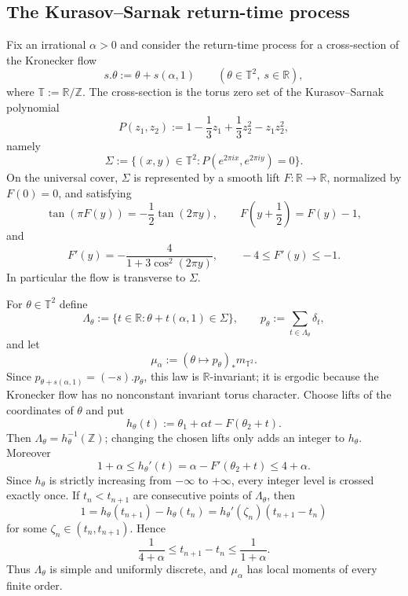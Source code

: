 \documentclass[11pt,reqno,a4paper]{amsart}
\numberwithin{equation}{section}
\theoremstyle{compact}
\theoremstyle{definition}
\theoremstyle{definition}
\begin{document}
\subsection{The Kurasov--Sarnak return-time process}
\label{subsec:kurasov-sarnak}

Fix an irrational $\alpha>0$ and consider the return-time process for a
cross-section of the Kronecker flow
\begin{equation}\label{eq:ks-kronecker-flow}
  s.\theta:=\theta+s(\alpha,1)
  \qquad(\theta\in\mathbb T^2,\ s\in\mathbb R),
\end{equation}
where $\mathbb T:=\mathbb R/\mathbb Z$.  The cross-section is the torus zero
set of the Kurasov--Sarnak polynomial
\begin{equation}\label{eq:ks-polynomial}
  P(z_1,z_2)
  :=1-\frac13z_1+\frac13z_2^2-z_1z_2^2,
\end{equation}
namely
\begin{equation}\label{eq:ks-zero-curve}
  \Sigma
  :=\bigl\{(x,y)\in\mathbb T^2:
      P(e^{2\pi i x},e^{2\pi i y})=0\bigr\}.
\end{equation}
On the universal cover, $\Sigma$ is represented by a smooth lift
$F:\mathbb R\to\mathbb R$, normalized by $F(0)=0$, and satisfying
\begin{equation}\label{eq:ks-curve-lift}
  \tan(\pi F(y))=-\frac12\tan(2\pi y),
  \qquad
  F\!\left(y+\frac12\right)=F(y)-1,
\end{equation}
and
\begin{equation}\label{eq:ks-curve-derivative}
  F'(y)=-\frac{4}{1+3\cos^2(2\pi y)},
  \qquad -4\leq F'(y)\leq-1.
\end{equation}
In particular the flow is transverse to $\Sigma$.

For $\theta\in\mathbb T^2$ define
\begin{equation}\label{eq:ks-point-process-factor}
  \Lambda_\theta
  :=\bigl\{t\in\mathbb R:
      \theta+t(\alpha,1)\in\Sigma\bigr\},
  \qquad
  p_\theta:=\sum_{t\in\Lambda_\theta}\delta_t,
\end{equation}
and let
\begin{equation}\label{eq:ks-invariant-law}
  \mu_\alpha:=(\theta\mapsto p_\theta)_*m_{\mathbb T^2}.
\end{equation}
Since
$p_{\theta+s(\alpha,1)}=(-s).p_\theta$, this law is $\mathbb R$-invariant;
it is ergodic because the Kronecker flow has no nonconstant invariant torus
character.  Choose lifts of the coordinates of $\theta$ and put
\[
  h_\theta(t):=\theta_1+\alpha t-F(\theta_2+t).
\]
Then $\Lambda_\theta=h_\theta^{-1}(\mathbb Z)$; changing the chosen lifts
only adds an integer to $h_\theta$.  Moreover
\[
  1+\alpha\leq h_\theta'(t)=\alpha-F'(\theta_2+t)\leq4+\alpha.
\]
Since $h_\theta$ is strictly increasing from $-\infty$ to $+\infty$, every
integer level is crossed exactly once.  If $t_n<t_{n+1}$ are consecutive
points of $\Lambda_\theta$, then
\[
  1=h_\theta(t_{n+1})-h_\theta(t_n)
    =h_\theta'(\zeta_n)(t_{n+1}-t_n)
\]
for some $\zeta_n\in(t_n,t_{n+1})$.  Hence
\[
  \frac1{4+\alpha}\leq t_{n+1}-t_n\leq\frac1{1+\alpha}.
\]
Thus $\Lambda_\theta$ is simple and uniformly discrete, and $\mu_\alpha$ has
local moments of every finite order.
\end{document}
